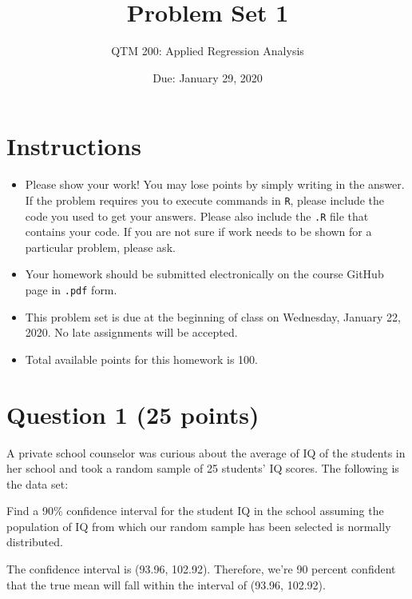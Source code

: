 \documentclass[12pt,letterpaper]{article}
\title{Problem Set 1}
\date{Due: January 29, 2020}
\author{QTM 200: Applied Regression Analysis}
\begin{document}
	\maketitle
	
	\section*{Instructions}
	\begin{itemize}
		\item Please show your work! You may lose points by simply writing in the answer. If the problem requires you to execute commands in \texttt{R}, please include the code you used to get your answers. Please also include the \texttt{.R} file that contains your code. If you are not sure if work needs to be shown for a particular problem, please ask.
		\item Your homework should be submitted electronically on the course GitHub page in \texttt{.pdf} form.
		\item This problem set is due at the beginning of class on Wednesday, January 22, 2020. No late assignments will be accepted.
		\item Total available points for this homework is 100.
	\end{itemize}
	
	\vspace{1cm}
	\section*{Question 1 (25 points)}
	
	A private school counselor was curious about the average of IQ of the students in her school and took a random sample of 25 students' IQ scores. The following is the data set:
	\vspace{.5cm}
	
	  
	\vspace{.5cm}
	
	\noindent Find a 90\% confidence interval for the student IQ in the school assuming the population of IQ from which our random sample has been selected is normally distributed. 
	
	\vspace{1cm}
	
	  
	
	\vspace{.5cm}
The confidence interval is (93.96, 102.92). Therefore, we're 90 percent confident that the true mean will fall within the interval of (93.96, 102.92).	
	\vspace{1cm}
		
\end{document}
